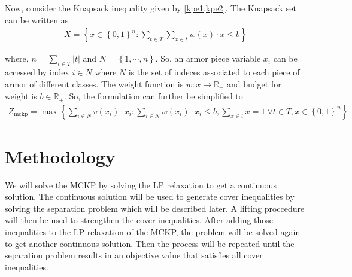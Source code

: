 \documentclass[10pt]{article}
\newcommand{\cbrace}[1]{\left\lbrace #1 \right\rbrace}
\begin{document}

    Now, consider the Knapsack inequality given by \cref{kpe1,kpe2}. The Knapsack set can be written as 
    \begin{align}
        X = \cbrace{ x \in \cbrace{0, 1}^n:  \sum\limits_{t \in T} \sum\limits_{x \in t} w(x) \cdot x \leq b}
    \end{align}

    where, $n = \sum\limits_{t \in T} |t|$ and $N = \cbrace{1,\cdots, n}$. So, an armor piece variable $x_i$ can be
    accessed by index $i \in N$ where $N$ is the set of indeces associated to each piece of armor of different classes.
    The weight function is $w: x \rightarrow \mathbb{R}_+$ and budget for weight is $b \in \mathbb{R}_+$. So, the
    formulation can further be simplified to 
    \begin{align}
        Z_{\mathrm{mckp}} = \max \cbrace{ \sum\limits_{i \in N} v(x_i) \cdot x_i: \sum\limits_{i \in N} w(x_i) \cdot x_i \leq b, \sum\limits_{x \in t} x = 1 ~\forall t \in T, x \in \cbrace{0, 1}^n}
    \end{align}
    

    \section{Methodology}
    We will solve the MCKP by solving the LP relaxation to get a continuous solution. The continuous solution will be
    used to generate cover inequalities by solving the separation problem which will be described later. A lifting
    proccedure will then be used to strengthen the cover inequalities. After adding those inequalities to the LP
    relaxation of the MCKP, the problem will be solved again to get another continuous solution. Then the process will
    be repeated until the separation problem results in an objective value that satisfies all cover inequalities. 
\end{document}
